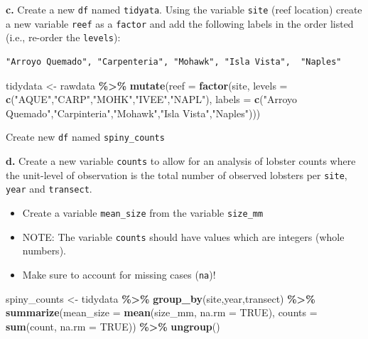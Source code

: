 \documentclass[
]{article}
\newenvironment{Shaded}{\begin{snugshade}}{\end{snugshade}}
\newcommand{\AttributeTok}[1]{\textcolor[rgb]{0.13,0.29,0.53}{#1}}
\newcommand{\ConstantTok}[1]{\textcolor[rgb]{0.56,0.35,0.01}{#1}}
\newcommand{\FunctionTok}[1]{\textcolor[rgb]{0.13,0.29,0.53}{\textbf{#1}}}
\newcommand{\NormalTok}[1]{#1}
\newcommand{\OtherTok}[1]{\textcolor[rgb]{0.56,0.35,0.01}{#1}}
\newcommand{\SpecialCharTok}[1]{\textcolor[rgb]{0.81,0.36,0.00}{\textbf{#1}}}
\newcommand{\StringTok}[1]{\textcolor[rgb]{0.31,0.60,0.02}{#1}}
\providecommand{\tightlist}{%
  \setlength{\itemsep}{0pt}\setlength{\parskip}{0pt}}
\begin{document}
\textbf{c.} Create a new \texttt{df} named \texttt{tidyata}. Using the
variable \texttt{site} (reef location) create a new variable
\texttt{reef} as a \texttt{factor} and add the following labels in the
order listed (i.e., re-order the \texttt{levels}):

\begin{verbatim}
"Arroyo Quemado", "Carpenteria", "Mohawk", "Isla Vista",  "Naples"
\end{verbatim}

\begin{Shaded}
\begin{Highlighting}[]
\NormalTok{tidydata }\OtherTok{\textless{}{-}}\NormalTok{ rawdata }\SpecialCharTok{\%\textgreater{}\%}
  \FunctionTok{mutate}\NormalTok{(}\AttributeTok{reef =} \FunctionTok{factor}\NormalTok{(site,}
                       \AttributeTok{levels =} \FunctionTok{c}\NormalTok{(}\StringTok{"AQUE"}\NormalTok{,}\StringTok{"CARP"}\NormalTok{,}\StringTok{"MOHK"}\NormalTok{,}\StringTok{"IVEE"}\NormalTok{,}\StringTok{"NAPL"}\NormalTok{),}
                       \AttributeTok{labels =} \FunctionTok{c}\NormalTok{(}\StringTok{"Arroyo Quemado"}\NormalTok{,}\StringTok{"Carpinteria"}\NormalTok{,}\StringTok{"Mohawk"}\NormalTok{,}\StringTok{"Isla Vista"}\NormalTok{,}\StringTok{"Naples"}\NormalTok{)))}
\end{Highlighting}
\end{Shaded}

Create new \texttt{df} named \texttt{spiny\_counts}

\textbf{d.} Create a new variable \texttt{counts} to allow for an
analysis of lobster counts where the unit-level of observation is the
total number of observed lobsters per \texttt{site}, \texttt{year} and
\texttt{transect}.

\begin{itemize}
\tightlist
\item
  Create a variable \texttt{mean\_size} from the variable
  \texttt{size\_mm}
\item
  NOTE: The variable \texttt{counts} should have values which are
  integers (whole numbers).
\item
  Make sure to account for missing cases (\texttt{na})!
\end{itemize}

\begin{Shaded}
\begin{Highlighting}[]
\NormalTok{spiny\_counts }\OtherTok{\textless{}{-}}\NormalTok{ tidydata }\SpecialCharTok{\%\textgreater{}\%}
  \FunctionTok{group\_by}\NormalTok{(site,year,transect) }\SpecialCharTok{\%\textgreater{}\%}
  \FunctionTok{summarize}\NormalTok{(}\AttributeTok{mean\_size =} \FunctionTok{mean}\NormalTok{(size\_mm, }
                             \AttributeTok{na.rm =} \ConstantTok{TRUE}\NormalTok{),}
            \AttributeTok{counts =} \FunctionTok{sum}\NormalTok{(count,}
                         \AttributeTok{na.rm =} \ConstantTok{TRUE}\NormalTok{)) }\SpecialCharTok{\%\textgreater{}\%}
  \FunctionTok{ungroup}\NormalTok{()}
\end{Highlighting}
\end{Shaded}
\end{document}
